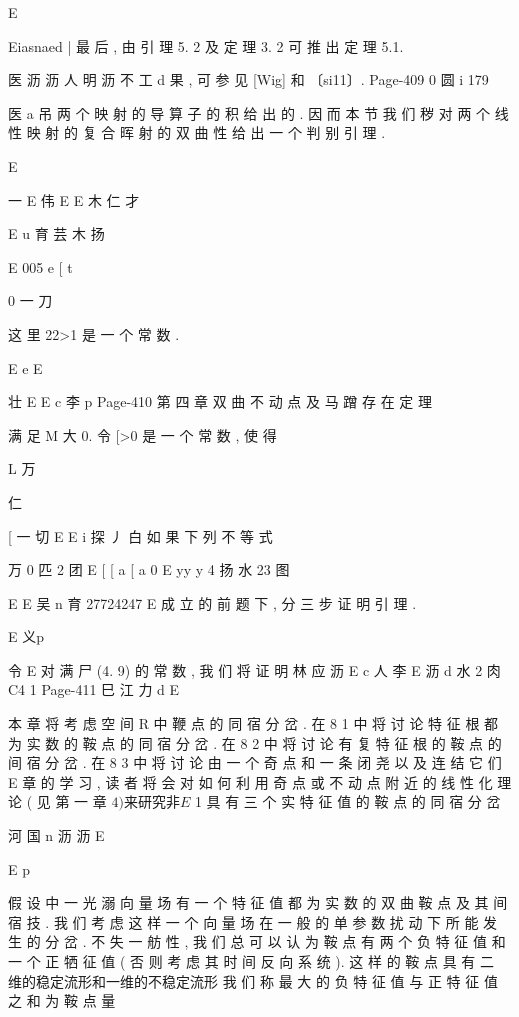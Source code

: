 {{{{{{{{{E

Eiasnaed |
最 后 , 由 引 理 5. 2 及 定 理 3. 2 可 推 出 定 理 5.1.

医 沥 沥 人 明 沥 不 工 d
果 , 可 参 见 [Wig] 和 〔si11〕.
Page-409
0 圆 i 179

医 a 吊
两 个 映 射 的 导 算 子 的 积 给 出 的 . 因 而 本 节 我 们 秽 对 两 个 线 性 映 射
的 复 合 晖 射 的 双 曲 性 给 出 一 个 判 别 引 理 .

E

一
E 伟
E
E 木 仁 才

E u 育 芸 木 扬

E
005 e
[ t

0 一 刀

这 里 22>1 是 一 个 常 数 .

E e
E

壮
E
E c 李 p
Page-410
第 四 章 双 曲 不 动 点 及 马 蹭 存 在 定 理

满 足 M 大 0. 令 [>0 是 一 个 常 数 , 使 得

L 万

仁

[ 一 切 E
E i 探 丿 白
如 果 下 列 不 等 式

万 0
匹 2 团 E
[ [
a [
a 0
E yy y 4 扬 水 23 图

E
E 吴 n 育 27724247
E
成 立 的 前 题 下 , 分 三 步 证 明 引 理 .

E 义p

令
E
对 满 尸 (4. 9) 的 常 数 , 我 们 将 证 明
林 应 沥
E
c 人 李
E 沥
d 水 2 肉
C4 1
Page-411
巳 江 力 d E

本 章 将 考 虑 空 间 R 中 鞭 点 的 同 宿 分 岔 . 在 8 1 中 将 讨 论 特 征
根 都 为 实 数 的 鞍 点 的 同 宿 分 岔 . 在 8 2 中 将 讨 论 有 复 特 征 根 的 鞍 点
的 间 宿 分 岔 . 在 8 3 中 将 讨 论 由 一 个 奇 点 和 一 条 闭 尧 以 及 连 结 它 们
E 章 的 学 习 , 读 者 将 会 对 如
何 利 用 奇 点 或 不 动 点 附 近 的 线 性 化 理 论 ( 见 第 一 章 $ 4) 来 研 究 非
E

$ 1 具 有 三 个 实 特 征 值 的 鞍 点 的 同 宿 分 岔

河 国 n 沥 沥
E

E p

假 设 中 一 光 溺 向 量 场 有 一 个 特 征 值 都 为 实 数 的 双 曲 鞍 点
及 其 间 宿 技 . 我 们 考 虑 这 样 一 个 向 量 场 在 一 般 的 单 参 数 扰 动 下 所
能 发 生 的 分 岔 . 不 失 一 舫 性 , 我 们 总 可 以 认 为 鞍 点 有 两 个 负 特 征 值
和 一 个 正 牺 征 值 ( 否 则 考 虑 其 时 间 反 向 系 统 ). 这 样 的 鞍 点 具 有 二
维的稳定流形和一维的不稳定流形 我 们 称 最 大 的 负 特 征 值 与 正
特 征 值 之 和 为 鞍 点 量

}}}}}}}}}
